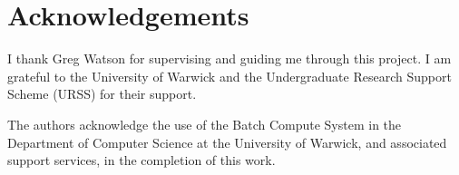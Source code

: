 \section*{Acknowledgements}

\vspace{2cm}

\large


I thank Greg Watson for supervising and guiding me through this project. I am grateful to the University of Warwick and the Undergraduate Research Support Scheme (URSS) for their support.

The authors acknowledge the use of the Batch Compute System in the Department of Computer Science at the University of Warwick, and associated support services, in the completion of this work.